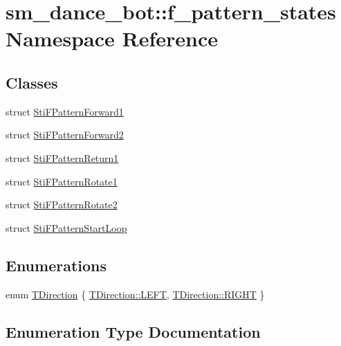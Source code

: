 \hypertarget{namespacesm__dance__bot_1_1f__pattern__states}{}\section{sm\+\_\+dance\+\_\+bot\+:\+:f\+\_\+pattern\+\_\+states Namespace Reference}
\label{namespacesm__dance__bot_1_1f__pattern__states}
\subsection*{Classes}
\begin{DoxyCompactItemize}
\item 
struct \hyperlink{classsm__dance__bot_1_1f__pattern__states_1_1StiFPatternForward1}{Sti\+F\+Pattern\+Forward1}
\item 
struct \hyperlink{classsm__dance__bot_1_1f__pattern__states_1_1StiFPatternForward2}{Sti\+F\+Pattern\+Forward2}
\item 
struct \hyperlink{classsm__dance__bot_1_1f__pattern__states_1_1StiFPatternReturn1}{Sti\+F\+Pattern\+Return1}
\item 
struct \hyperlink{classsm__dance__bot_1_1f__pattern__states_1_1StiFPatternRotate1}{Sti\+F\+Pattern\+Rotate1}
\item 
struct \hyperlink{classsm__dance__bot_1_1f__pattern__states_1_1StiFPatternRotate2}{Sti\+F\+Pattern\+Rotate2}
\item 
struct \hyperlink{classsm__dance__bot_1_1f__pattern__states_1_1StiFPatternStartLoop}{Sti\+F\+Pattern\+Start\+Loop}
\end{DoxyCompactItemize}
\subsection*{Enumerations}
\begin{DoxyCompactItemize}
\item 
enum \hyperlink{namespacesm__dance__bot_1_1f__pattern__states_acc99b72745466e5dcee9272425a34e58}{T\+Direction} \{ \hyperlink{namespacesm__dance__bot_1_1f__pattern__states_acc99b72745466e5dcee9272425a34e58a684d325a7303f52e64011467ff5c5758}{T\+Direction\+::\+L\+E\+FT}, 
\hyperlink{namespacesm__dance__bot_1_1f__pattern__states_acc99b72745466e5dcee9272425a34e58a21507b40c80068eda19865706fdc2403}{T\+Direction\+::\+R\+I\+G\+HT}
 \}
\end{DoxyCompactItemize}


\subsection{Enumeration Type Documentation}
\mbox{\label{namespacesm__dance__bot_1_1f__pattern__states_acc99b72745466e5dcee9272425a34e58}} 
